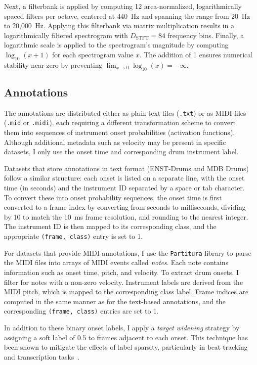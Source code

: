 Next, a filterbank is applied by computing 12 area-normalized, logarithmically spaced filters per octave, centered at 440~Hz and spanning the range from 20~Hz to 20,000~Hz. Applying this filterbank via matrix multiplication results in a logarithmically filtered spectrogram with $D_\text{STFT} = 84$ frequency bins. Finally, a logarithmic scale is applied to the spectrogram's magnitude by computing $\log_{10}(x + 1)$ for each spectrogram value $x$. The addition of 1 ensures numerical stability near zero by preventing $\lim_{x \to 0}\log_{10}(x) = -\infty$.

\subsection{Annotations}

The annotations are distributed either as plain text files (\texttt{.txt}) or as MIDI files (\texttt{.mid} or \texttt{.midi}), each requiring a different transformation scheme to convert them into sequences of instrument onset probabilities (activation functions). Although additional metadata such as velocity may be present in specific datasets, I only use the onset time and corresponding drum instrument label.

Datasets that store annotations in text format (ENST-Drums and MDB Drums) follow a similar structure: each onset is listed on a separate line, with the onset time (in seconds) and the instrument ID separated by a space or tab character. To convert these into onset probability sequences, the onset time is first converted to a frame index by converting from seconds to milliseconds, dividing by 10 to match the 10~ms frame resolution, and rounding to the nearest integer. The instrument ID is then mapped to its corresponding class, and the appropriate \texttt{(frame, class)} entry is set to 1.

For datasets that provide MIDI annotations, I use the \texttt{Partitura} library to parse the MIDI files into arrays of MIDI events called \textit{notes}. Each note contains information such as onset time, pitch, and velocity. To extract drum onsets, I filter for notes with a non-zero velocity. Instrument labels are derived from the MIDI pitch, which is mapped to the corresponding class label. Frame indices are computed in the same manner as for the text-based annotations, and the corresponding \texttt{(frame, class)} entries are set to 1.

In addition to these binary onset labels, I apply a \textit{target widening} strategy by assigning a soft label of 0.5 to frames adjacent to each onset. This technique has been shown to mitigate the effects of label sparsity, particularly in beat tracking and transcription tasks~\cite{9747048, signals4040042}.

